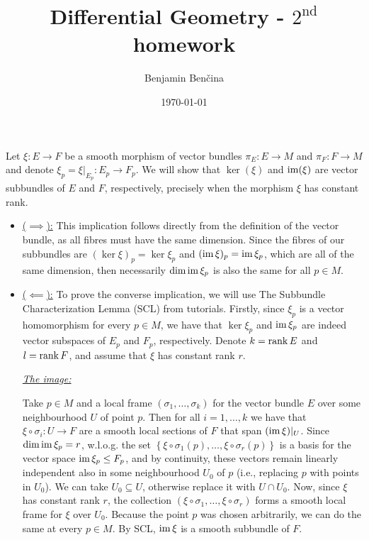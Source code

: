 \documentclass[a4paper, 12pt]{article}
\title{Differential Geometry - $2^{\text{nd}}$ homework}
\author{Benjamin Benčina}
\date{\today}
\begin{document}
\maketitle

\begin{Exercise}
    Let $\xi \colon E \to F$ be a smooth morphism of vector bundles $\pi_E \colon E \to M$ and $\pi_F \colon F \to M$ and denote $\xi_p = \xi|_{E_p} \colon E_p \to F_p$.
    We will show that $\ker(\xi)$ and $\operatorname{im}(\xi)$ are vector subbundles of $E$ and $F$, respectively, precisely when the morphism $\xi$ has constant rank.
    \begin{itemize}
        \item \underline{($\implies$):}
            This implication follows directly from the definition of the vector bundle,
            as all fibres must have the same dimension.
            Since the fibres of our subbundles are $(\ker\xi)_p = \ker\xi_p$ and $(\operatorname{im}\xi)_p = \operatorname{im}\xi_p$, which are all of the same dimension,
            then necessarily $\dim\operatorname{im}\xi_p$ is also the same for all $p \in M$.
        \item \underline{($\impliedby$):}
            To prove the converse implication, we will use The Subbundle Characterization Lemma (SCL) from tutorials.
            Firstly, since $\xi_p$ is a vector homomorphism for every $p \in M$,
            we have that $\ker\xi_p$ and $\operatorname{im}\xi_p$ are indeed vector subspaces of $E_p$ and $F_p$, respectively.
            Denote $k = \operatorname{rank} E$ and $l = \operatorname{rank} F$, and assume that $\xi$ has constant rank $r$.

            \underline{\emph{The image:}}

            Take $p \in M$ and a local frame $(\sigma_1,\dots,\sigma_k)$ for the vector bundle $E$ over some neighbourhood $U$ of point $p$.
            Then for all $i = 1,\dots,k$ we have that $\xi\circ\sigma_i \colon U \to F$ are a smooth local sections of $F$ that span $(\operatorname{im}\xi)|_{U}$.
            Since $\dim\operatorname{im}\xi_p = r$, w.l.o.g. the set $\left\{ \xi\circ\sigma_1(p),\dots,\xi\circ\sigma_r(p) \right\}$ is a basis for the vector space $\operatorname{im}\xi_p \leq F_p$,
            and by continuity, these vectors remain linearly independent also in some neighbourhood $U_0$ of $p$ (i.e., replacing $p$ with points in $U_0$).
            We can take $U_0 \subseteq U$, otherwise replace it with $U \cap U_0$.
            Now, since $\xi$ has constant rank $r$, the collection $(\xi\circ\sigma_1,\dots,\xi\circ\sigma_r)$ forms a smooth local frame for $\xi$ over $U_0$.
            Because the point $p$ was chosen arbitrarily, we can do the same at every $p \in M$.
            By SCL, $\operatorname{im}\xi$ is a smooth subbundle of $F$.


\end{itemize}
\end{Exercise}
\end{document}
